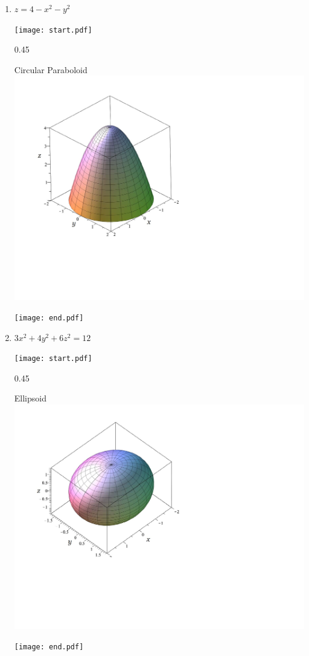 \documentclass[12pt]{article}
\begin{document}
\begin{enumerate}
\item $z=4-x^2-y^2$

\texttt{[image: start.pdf]}
{{{0.45\linewidth}{\begin{center}Circular Paraboloid\\\includegraphics[scale=0.35]{paraboloid4.pdf}\end{center}}}}
\texttt{[image: end.pdf]}


\item $3x^2+4y^2+6z^2=12$

\texttt{[image: start.pdf]}
{{{0.45\linewidth}{\begin{center}Ellipsoid\\\includegraphics[scale=0.4]{ellipsoid2.pdf}\end{center}}}}
\texttt{[image: end.pdf]}



\end{enumerate}
\end{document}
